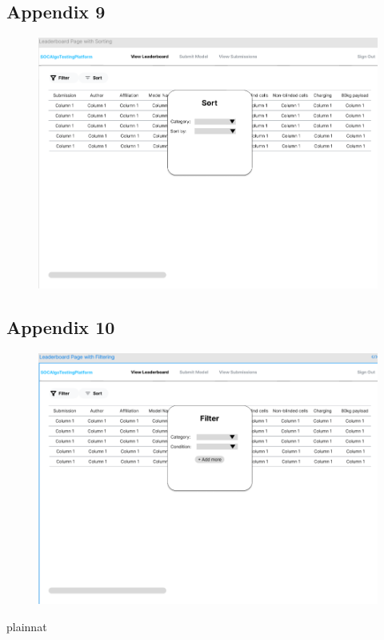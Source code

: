 \documentclass[12pt, titlepage]{article}
\begin{document}
\subsection{Appendix 9} \label{Appendix 9}
\begin{figure}[H]
    \centering
    \includegraphics[width=1\linewidth]{.//Interface/Sorting.png}
\end{figure}
\subsection{Appendix 10} \label{Appendix 10}
\begin{figure}[H]
    \centering
    \includegraphics[width=1\linewidth]{.//Interface/Filtering.png}
\end{figure}


 {plainnat}


\newpage{}
\end{document}
